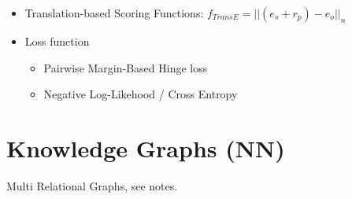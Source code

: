 \begin{itemize}
\begin{itemize}
\begin{itemize}
            \item Translation-based Scoring Functions: \(f_{TransE} = ||(e_s + r_p) - e_o ||_n\)
            \item Loss function
            \begin{itemize}
                \item Pairwise Margin-Based Hinge loss
                \item Negative Log-Likehood / Cross Entropy
            \end{itemize}
        \end{itemize}
    \end{itemize}
\end{itemize}

\section{Knowledge Graphs (NN)}
Multi Relational Graphs, see notes.